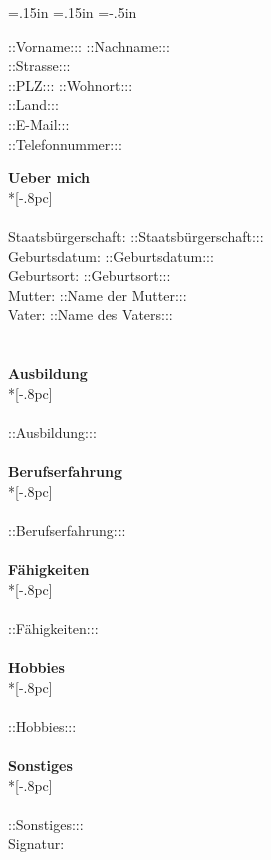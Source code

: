 \oddsidemargin=.15in
\evensidemargin=.15in
\textwidth=6in
\topmargin=-.5in
\textheight=9in
\parindent=0in

\pagestyle{empty}



\begin{center}
{\Large ::Vorname::: ::Nachname:::} \\[.5pc]
::Strasse::: \\
::PLZ::: ::Wohnort::: \\ 
::Land::: \\[.5pc]
::E-Mail::: \\
::Telefonnummer::: \\[5pc]
\end{center}

{\large \bf Ueber mich} \\*[-.8pc]
\underline{\hspace{6in}} \\
\\
Staatsbürgerschaft: ::Staatsbürgerschaft::: \\
Geburtsdatum: ::Geburtsdatum::: \\
Geburtsort: ::Geburtsort::: \\
Mutter: ::Name der Mutter::: \\
Vater: ::Name des Vaters::: \\
\\
\\
{\large \bf Ausbildung} \\*[-.8pc]
\underline{\hspace{6in}} \\
\\
::Ausbildung:::
\\
\\
{\large \bf Berufserfahrung} \\*[-.8pc]
\underline{\hspace{6in}} \\
\\
::Berufserfahrung:::
\\
\\
{\large \bf Fähigkeiten} \\*[-.8pc]
\underline{\hspace{6in}} \\
\\
::Fähigkeiten:::
\\
\\
{\large \bf Hobbies} \\*[-.8pc]
\underline{\hspace{6in}} \\
\\
::Hobbies:::
\\
\\
{\large \bf Sonstiges} \\*[-.8pc]
\underline{\hspace{6in}} \\
\\
::Sonstiges:::
\\
[5pc]

Signatur: \\

